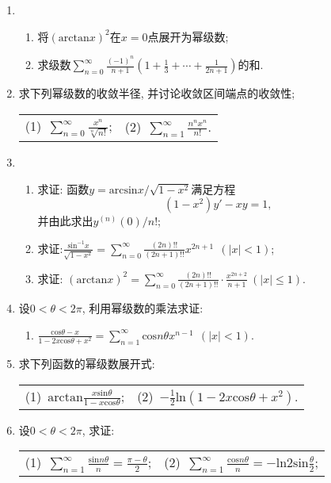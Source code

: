 \begin{enumerate}
\begin{enumerate}
\end{enumerate}
\item 
\begin{enumerate}
	\item 将$(\mathrm{arctan}x)^2$在$x=0$点展开为幂级数;
	\item 求级数$\sum\limits_{n=0}^{\infty}\frac{(-1)^n}{n+1}(1+\frac{1}{3}+\cdots+\frac{1}{2n+1})$的和.
\end{enumerate}
\item 求下列幂级数的收敛半径, 并讨论收敛区间端点的收敛性;
\begin{table}[H]
	\begin{tabular}{ll}
		(1)\ $\sum\limits_{n=0}^{\infty}\frac{x^n}{\sqrt[n]{n!}}$;\qquad \qquad \qquad \qquad \qquad &(2)\ $\sum\limits_{n=1}^{\infty}\frac{n^nx^n}{n!}$.
	\end{tabular}
\end{table}
\item 
\begin{enumerate}
	\item 求证: 函数$y=\mathrm{arcsin}x/\sqrt{1-x^2}$满足方程$$
	(1-x^2)y'-xy=1,$$
	并由此求出$y^{(n)}(0)/n!$;
	\item 求证:$\frac{\mathrm{sin}^{-1}x}{\sqrt{1-x^2}}=\sum\limits_{n=0}^{\infty}\frac{(2n)!!}{(2n+1)!!}x^{2n+1}\ \ (|x|<1)$;
	\item 求证: $(\mathrm{arctan}x)^2=\sum\limits_{n=0}^{\infty}\frac{(2n)!!}{(2n+1)!!}\cdot\frac{x^{2n+2}}{n+1}\ (|x|\le 1)$.
\end{enumerate}
\item 设$0<\theta<2\pi$, 利用幂级数的乘法求证:
\begin{enumerate}
	\item $\frac{\mathrm{cos}\theta-x}{1-2x\mathrm{cos}\theta+x^2}=\sum\limits_{n=1}^{\infty}\mathrm{cos}n\theta x^{n-1}\ \ (|x|<1)$.
\end{enumerate}
\item 求下列函数的幂级数展开式:
\begin{table}[H]
	\begin{tabular}{ll}
		(1)\ $\mathrm{arctan}\frac{x\mathrm{sin}\theta}{1-x\mathrm{cos}\theta}$;\qquad \qquad \qquad \qquad \qquad&(2)\ $-\frac{1}{2}\mathrm{ln}(1-2x\mathrm{cos}\theta+x^2)$. 	
	\end{tabular}
\end{table}
\item 设$0<\theta<2\pi$, 求证:
\begin{table}[H]
	\begin{tabular}{ll}
		(1)\ $\sum\limits_{n=1}^{\infty}\frac{\mathrm{sin}n\theta}{n}=\frac{\pi - \theta}{2}$;\qquad \qquad \qquad \qquad \qquad &(2)\ $\sum\limits_{n=1}^{\infty}\frac{\mathrm{cos}n\theta}{n}=-\mathrm{ln}2\mathrm{sin}\frac{\theta}{2}$;\\

\end{tabular}
\end{table}
\end{enumerate}
